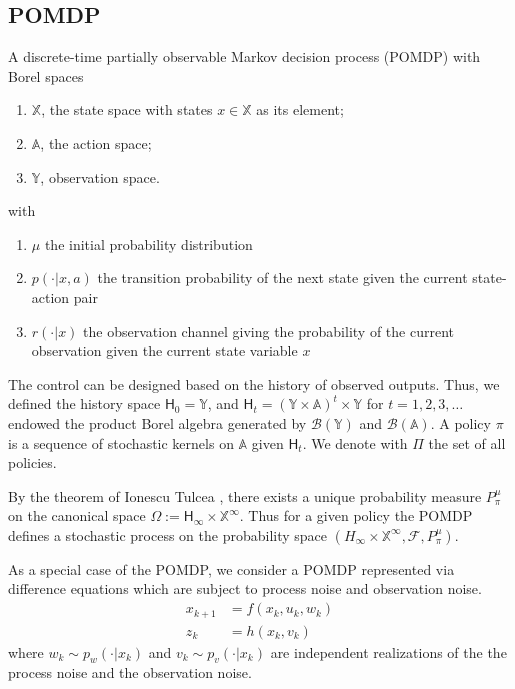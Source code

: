 \documentclass{ifacconf}
\newcommand{\X}{{\mathbb{X}}}
\newcommand{\Y}{{\mathbb{Y}}}
\newcommand{\U}{{\mathbb{A}}}
\newcommand{\Hist}{{\mathsf{H}}}
\renewcommand{\P}{P}
\begin{document}
\subsection{POMDP}\label{sec:POMDP}
\begin{definition} \label{def:MDP}
A discrete-time partially observable Markov decision process (POMDP) with Borel spaces
\begin{enumerate}
	\item $\X$, the state space with states $x\in\X$ as its element;
	\item $\U$, the action space;
	\item $\Y$, observation space.
\end{enumerate}
with 
\begin{enumerate}
\item $\mu$ the initial probability distribution
\item $p(\cdot|x,a)$ the transition probability of the next state given the current state-action pair
\item $r(\cdot|x)$ the observation channel giving the probability of the current observation given the current state variable $x$	
\end{enumerate}


\end{definition} 

The control can be designed based on the history of observed outputs. Thus, we defined the history space $\Hist_0=\Y$, and $\Hist_t=(\Y\times \U)^t\times \Y$ for $t=1,2,3,\ldots$ endowed the product Borel algebra generated by $\mathcal B (\Y)$ and $\mathcal B(\U)$.
A policy $\pi$ is a sequence of stochastic kernels on $\U$ given $\Hist_t$. 
We denote with $\Pi$ the set of all policies.



By the theorem of Ionescu Tulcea \cite{hll1996}, there exists a unique probability measure $\P_\pi^\mu$ on the canonical space $\Omega:=\Hist_\infty\times\X^\infty$. Thus for a given policy the POMDP defines a stochastic process on the probability space  
 $(H_\infty\times \X^\infty,\mathcal F,\P_\pi^\mu)$.

As a special case of the POMDP, we consider a POMDP represented via difference equations which are subject to process noise and observation noise.
\begin{align*}
x_{k+1}&=f(x_k,u_k,w_k)\\
z_k&=h(x_k,v_k)
\end{align*}
where $w_k\sim p_w(\cdot|x_k)$ and $v_k\sim p_v(\cdot|x_k)$ are independent realizations of the the process noise and the observation noise.
\end{document}
